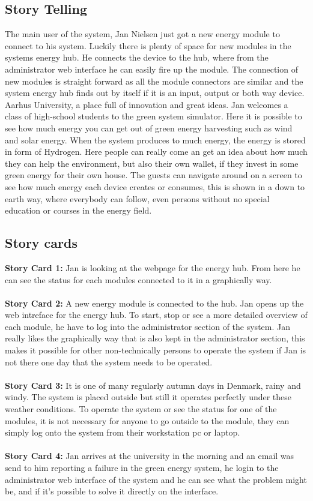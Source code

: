 \subsection{Story Telling}
The main user of the system, Jan Nielsen just got a new energy module to connect to his system. Luckily there is plenty of space
for new modules in the systems energy hub. He connects the device to the hub, where from the administrator web interface he can easily fire up the module.
The connection of new modules is straight forward as all the module connectors are similar and the system energy hub finds out by itself
if it is an input, output or both way device.
\newline
Aarhus University, a place full of innovation and great ideas. Jan welcomes a class of high-school students to the green system simulator. Here it
is possible to see how much energy you can get out of green energy harvesting
such as wind and solar energy. When the system produces to much energy, the 
energy is stored in form of Hydrogen. Here people can really come an get an idea about 
how much they can help the environment, but also their own wallet, if they invest in some green energy for their own house.
The guests can navigate around on a screen to see how much energy each device 
creates or consumes, this is shown in a down to earth way, where everybody can follow, 
even persons without no special education or courses in the energy field.

\subsection{Story cards}
\textbf{Story Card 1:} Jan is looking at the webpage for the energy hub. From here he can see the status for each modules connected to it
in a graphically way.\\\\
\textbf{Story Card 2:} A new energy module is connected to the hub. Jan opens up the web intreface for the energy hub. 
To start, stop or see a more detailed overview of each module, he have to log into the administrator section of the system.
Jan really likes the graphically way that is also kept in the administrator section, this makes it possible for other
non-technically persons to operate the system if Jan is not there one day that the system needs to be operated.\\\\
\textbf{Story Card 3:} It is one of many regularly autumn days in Denmark, rainy and windy. The system is placed outside
but still it operates perfectly under these weather conditions. To operate the system or see the status for one of the modules,
it is not necessary for anyone to go outside to the module, they can simply log onto the system from their workstation pc or laptop.\\\\
\textbf{Story Card 4:} Jan arrives at the university in the morning and an email was send to him reporting a failure in the green energy system, he login to the administrator web interface of the system and he can see what the problem might be, and if it's possible to solve it directly on the interface.
\newpage
